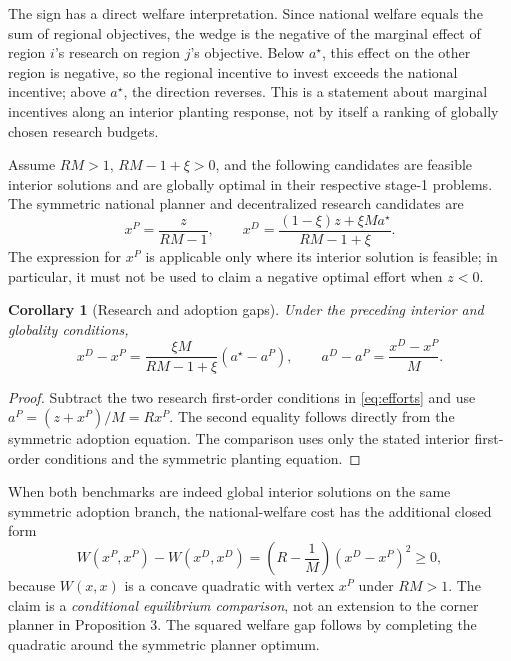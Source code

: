 \documentclass[USenglish]{article}
\newtheorem{corollary}{Corollary}
\begin{document}
The sign has a direct welfare interpretation. Since national welfare equals the sum of regional objectives, the wedge is the negative of the marginal effect of region $i$'s research on region $j$'s objective. Below $a^\star$, this effect on the other region is negative, so the regional incentive to invest exceeds the national incentive; above $a^\star$, the direction reverses. This is a statement about marginal incentives along an interior planting response, not by itself a ranking of globally chosen research budgets.

Assume $RM>1$, $RM-1+\xi>0$, and the following candidates are feasible interior solutions and are globally optimal in their respective stage-1 problems. The symmetric national planner and decentralized research candidates are
\begin{equation}
 x^P=\frac{z}{RM-1},\qquad
 x^D=\frac{(1-\xi)z+\xi M a^\star}{RM-1+\xi}.
 \label{eq:efforts}
\end{equation}
The expression for $x^P$ is applicable only where its interior solution is feasible; in particular, it must not be used to claim a negative optimal effort when $z<0$.

\begin{corollary}[Research and adoption gaps]
Under the preceding interior and globality conditions,
\begin{equation}
 x^D-x^P=\frac{\xi M}{RM-1+\xi}(a^\star-a^P),
 \qquad a^D-a^P=\frac{x^D-x^P}{M}.
 \label{eq:corollary}
\end{equation}
\end{corollary}
\begin{proof}
Subtract the two research first-order conditions in \eqref{eq:efforts} and use $a^P=(z+x^P)/M=Rx^P$. The second equality follows directly from the symmetric adoption equation. The comparison uses only the stated interior first-order conditions and the symmetric planting equation.
\end{proof}

When both benchmarks are indeed global interior solutions on the same symmetric adoption branch, the national-welfare cost has the additional closed form
\begin{equation}
W(x^P,x^P)-W(x^D,x^D)
=\left(R-\frac{1}{M}\right)(x^D-x^P)^2\geq0,
\label{eq:interiorwelfarecost}
\end{equation}
because $W(x,x)$ is a concave quadratic with vertex $x^P$ under $RM>1$. The claim is a \emph{conditional equilibrium comparison}, not an extension to the corner planner in Proposition 3. The squared welfare gap follows by completing the quadratic around the symmetric planner optimum.
\end{document}
